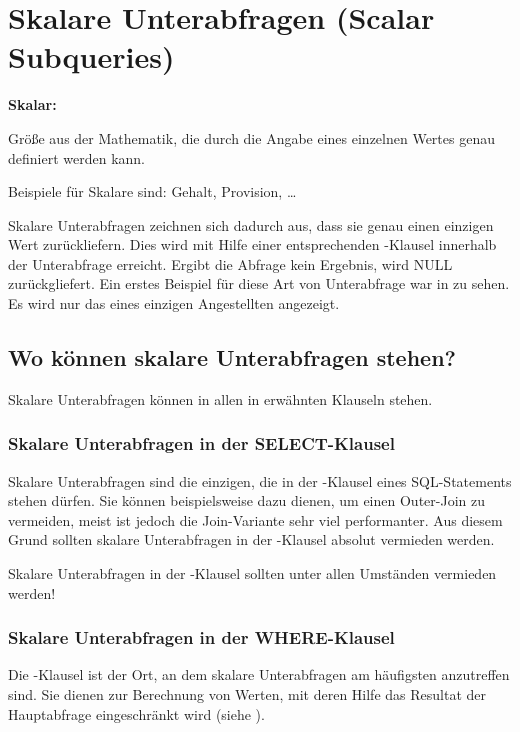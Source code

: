     \section{Skalare Unterabfragen (Scalar Subqueries)}
      \begin{merke}
        \textbf{Skalar:}
        \vspace{1em}

        Gr\"o\ss{}e aus der Mathematik, die durch die Angabe eines einzelnen Wertes genau definiert werden kann.
        \vspace{1em}

        Beispiele f\"ur Skalare sind: Gehalt, Provision, \dots
      \end{merke}
      Skalare Unterabfragen zeichnen sich dadurch aus, dass sie genau einen einzigen Wert zur\"uckliefern.   Dies wird mit Hilfe einer entsprechenden \WHERE-Klausel innerhalb der Unterabfrage erreicht. Ergibt die Abfrage kein Ergebnis, wird NULL zur\"uckgliefert. Ein erstes Beispiel f\"ur diese Art von Unterabfrage war in  zu sehen. Es wird nur das  eines einzigen Angestellten angezeigt.
      \subsection{Wo k\"onnen skalare Unterabfragen stehen?}
        Skalare Unterabfragen k\"onnen in allen in  erw\"ahnten Klauseln stehen.
        \subsubsection{Skalare Unterabfragen in der SELECT-Klausel}
          Skalare Unterabfragen sind die einzigen, die in der \SELECT-Klausel eines SQL-Statements stehen d\"urfen. Sie k\"onnen beispielsweise dazu dienen, um einen Outer-Join zu vermeiden, meist ist jedoch die Join-Variante sehr viel performanter. Aus diesem Grund sollten skalare Unterabfragen in der \SELECT-Klausel absolut vermieden werden.
          \begin{merke}
            Skalare Unterabfragen in der \SELECT-Klausel sollten unter allen Umst\"anden vermieden werden!
          \end{merke}
        \subsubsection{Skalare Unterabfragen in der WHERE-Klausel}
          Die \WHERE-Klausel ist der Ort, an dem skalare Unterabfragen am h\"aufigsten anzutreffen sind. Sie dienen zur Berechnung von Werten, mit deren Hilfe das Resultat der Hauptabfrage eingeschr\"ankt wird (siehe ).
